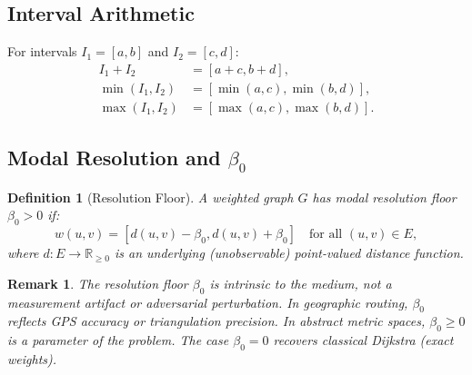 \documentclass[twocolumn,11pt,a4paper]{article}
\newtheorem{definition}[theorem]{Definition}
\newtheorem{remark}[theorem]{Remark}
\theoremstyle{definition}
\begin{document}
\subsection{Interval Arithmetic}

For intervals $I_1 = [a, b]$ and $I_2 = [c, d]$:
\begin{align}
I_1 + I_2 &= [a + c, b + d], \\
\min(I_1, I_2) &= [\min(a, c), \min(b, d)], \\
\max(I_1, I_2) &= [\max(a, c), \max(b, d)].
\end{align}

\subsection{Modal Resolution and $\beta_0$}

\begin{definition}[Resolution Floor]
\label{def:resolution_floor}
A weighted graph $G$ has \emph{modal resolution floor} $\beta_0 > 0$ if:
\begin{equation}
w(u,v) = [d(u,v) - \beta_0, d(u,v) + \beta_0]
\quad \text{for all } (u,v) \in E,
\end{equation}
where $d: E \to \mathbb{R}_{\geq 0}$ is an underlying (unobservable) point-valued distance function.
\end{definition}

\begin{remark}
The resolution floor $\beta_0$ is \emph{intrinsic to the medium}, not a measurement artifact or adversarial perturbation. In geographic routing, $\beta_0$ reflects GPS accuracy or triangulation precision. In abstract metric spaces, $\beta_0 \geq 0$ is a parameter of the problem. The case $\beta_0 = 0$ recovers classical Dijkstra (exact weights).
\end{remark}
\end{document}
